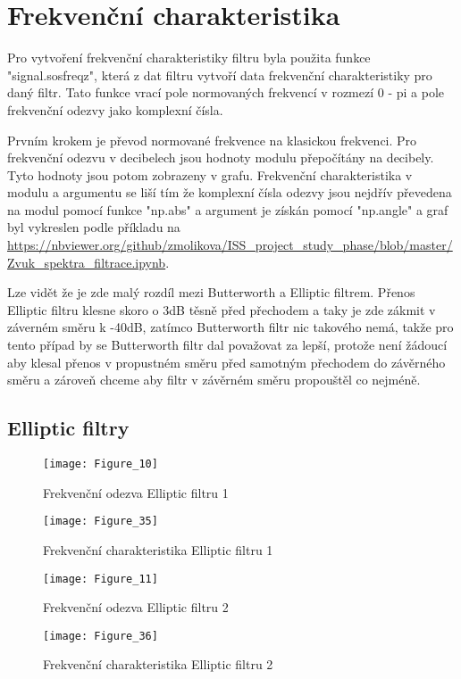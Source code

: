 \section{Frekvenční charakteristika}

Pro vytvoření frekvenční charakteristiky filtru byla použita funkce "signal.sosfreqz", která z dat filtru vytvoří data frekvenční charakteristiky pro daný filtr.
Tato funkce vrací pole normovaných frekvencí v rozmezí 0 - pi a pole frekvenční odezvy jako komplexní čísla.

Prvním krokem je převod normované frekvence na klasickou frekvenci.
Pro frekvenční odezvu v decibelech jsou hodnoty modulu přepočítány na decibely.
Tyto hodnoty jsou potom zobrazeny v grafu.
Frekvenční charakteristika v modulu a argumentu se liší tím že komplexní čísla odezvy jsou nejdřív převedena na modul pomocí funkce "np.abs" a argument je získán pomocí "np.angle" a graf byl vykreslen podle příkladu na \url{https://nbviewer.org/github/zmolikova/ISS_project_study_phase/blob/master/Zvuk_spektra_filtrace.ipynb}.

Lze vidět že je zde malý rozdíl mezi Butterworth a Elliptic filtrem. Přenos Elliptic filtru klesne skoro o 3dB těsně před přechodem a taky je zde zákmit v záverném směru k -40dB, zatímco Butterworth filtr nic takového nemá, takže pro tento případ by se Butterworth filtr dal považovat za lepší, protože není žádoucí aby klesal přenos v propustném směru před samotným přechodem do závěrného směru a zároveň chceme aby filtr v závěrném směru propouštěl co nejméně.
\subsection{Elliptic filtry}
\begin{figure}[H] 
	\centering
	\texttt{[image: Figure\_10]}
	\caption{Frekvenční odezva Elliptic filtru 1}
\end{figure}

\begin{figure}[H] 
	\centering
	\texttt{[image: Figure\_35]}
	\caption{Frekvenční charakteristika Elliptic filtru 1}
\end{figure}

\begin{figure}[H] 
	\centering
	\texttt{[image: Figure\_11]}
	\caption{Frekvenční odezva Elliptic filtru 2}
\end{figure}

\begin{figure}[H] 
	\centering
	\texttt{[image: Figure\_36]}
	\caption{Frekvenční charakteristika Elliptic filtru 2}
\end{figure}

